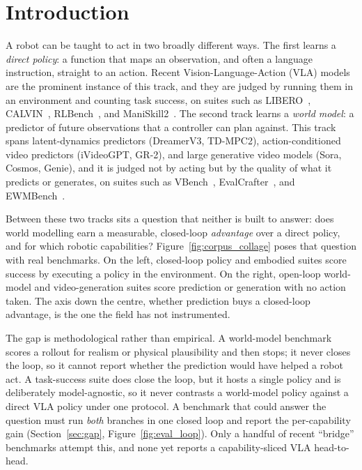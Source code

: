 \section{Introduction}
\label{sec:intro}

A robot can be taught to act in two broadly different ways. The first learns a \emph{direct policy}:
a function that maps an observation, and often a language instruction, straight to an action. Recent
Vision-Language-Action (VLA) models are the prominent instance of this track, and they are judged by
running them in an environment and counting task success, on suites such as
LIBERO~\cite{libero}, CALVIN~\cite{calvin}, RLBench~\cite{rlbench}, and
ManiSkill2~\cite{maniskill2}. The second track learns a \emph{world model}: a predictor of future
observations that a controller can plan against. This track spans latent-dynamics predictors
(DreamerV3, TD-MPC2), action-conditioned video predictors (iVideoGPT, GR-2), and large generative
video models (Sora, Cosmos, Genie), and it is judged not by acting but by the quality of what it
predicts or generates, on suites such as VBench~\cite{vbench}, EvalCrafter~\cite{evalcrafter}, and
EWMBench~\cite{ewmbench}.

Between these two tracks sits a question that neither is built to answer: does world modelling earn a
measurable, closed-loop \emph{advantage} over a direct policy, and for which robotic capabilities?
Figure~\ref{fig:corpus_collage} poses that question with real benchmarks. On the left, closed-loop
policy and embodied suites score success by executing a policy in the environment. On the right,
open-loop world-model and video-generation suites score prediction or generation with no action
taken. The axis down the centre, whether prediction buys a closed-loop advantage, is the one the
field has not instrumented.



The gap is methodological rather than empirical. A world-model benchmark scores a rollout for
realism or physical plausibility and then stops; it never closes the loop, so it cannot report
whether the prediction would have helped a robot act. A task-success suite does close the loop, but
it hosts a single policy and is deliberately model-agnostic, so it never contrasts a world-model
policy against a direct VLA policy under one protocol. A benchmark that could answer the question
must run \emph{both} branches in one closed loop and report the per-capability gain
(Section~\ref{sec:gap}, Figure~\ref{fig:eval_loop}). Only a handful of recent
``bridge'' benchmarks attempt this, and none yet reports a capability-sliced VLA head-to-head.

